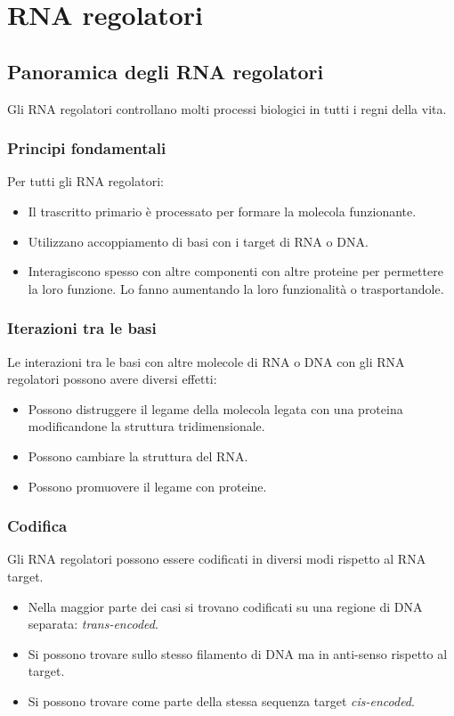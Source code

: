 \chapter{RNA regolatori}
\section{Panoramica degli RNA regolatori}
Gli RNA regolatori controllano molti processi biologici in tutti i regni della vita.
\subsection{Principi fondamentali}
Per tutti gli RNA regolatori:
\begin{itemize}
	\item Il trascritto primario \`e processato per formare la molecola funzionante.
	\item Utilizzano accoppiamento di basi con i target di RNA o DNA.
	\item Interagiscono spesso con altre componenti con altre proteine per permettere la loro funzione. Lo fanno aumentando la loro funzionalit\`a o trasportandole.
\end{itemize}
\subsection{Iterazioni tra le basi}
Le interazioni tra le basi con altre molecole di RNA o DNA con gli RNA regolatori possono avere diversi effetti:
\begin{itemize}
	\item Possono distruggere il legame della molecola legata con una proteina modificandone la struttura tridimensionale.
	\item Possono cambiare la struttura del RNA.
	\item Possono promuovere il legame con proteine.
\end{itemize}
\subsection{Codifica}
Gli RNA regolatori possono essere codificati in diversi modi rispetto al RNA target.
\begin{itemize}
	\item Nella maggior parte dei casi si trovano codificati su una regione di DNA separata: \emph{trans-encoded}.
	\item Si possono trovare sullo stesso filamento di DNA ma in anti-senso rispetto al target.
	\item Si possono trovare come parte della stessa sequenza target \emph{cis-encoded}.
\end{itemize}
